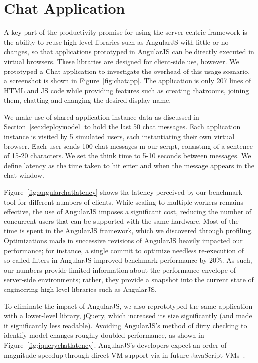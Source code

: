 \section{Chat Application} 

A key part of the productivity promise for using the server-centric \cb framework
is the ability to reuse high-level libraries such as AngularJS with little or
no changes, so that applications prototyped in AngularJS can be directly
executed in virtual browsers. These libraries are designed for client-side
use, however. We prototyped a Chat application to investigate the overhead
of this usage scenario, a screenshot is shown in Figure~\ref{fig:chatapp}.  
The application is only 207 lines of HTML and JS code while providing features such as 
creating chatrooms, joining them, chatting and changing the desired display name.

\chatroomfig{}

We make use of shared application instance data as discussed in Section~\ref{sec:deploymodel}
to hold the last 50 chat messages.  Each application instance is visited by 5 simulated users,
each instantiating their own virtual browser.  Each user sends 100 chat messages in our
script, consisting of a sentence of 15-20 characters.  We set the think time to 5-10 seconds
between messages.  We define latency as the time taken to hit enter and when the  message
appears in the chat window.

\angularchatlatency{}

Figure~\ref{fig:angularchatlatency} shows the latency perceived by our benchmark tool
for different numbers of clients.  While scaling to multiple workers remains effective,
the use of AngularJS imposes a significant cost, reducing the number of concurrent users 
that can be supported with the same hardware. Most of the time is spent in the AngularJS
framework, which we discovered through profiling. Optimizations made in successive revisions
of AngularJS heavily impacted our performance; for instance, a single commit to optimize
needless re-execution of so-called filters in AngularJS improved benchmark performance by 20\%.
As such, our numbers provide limited information about the performance envelope of
server-side environments; rather, they provide a snapshot into the current state of
engineering high-level libraries such as AngularJS.  

\jquerychatlatency{}
To eliminate the impact of AngularJS, we also reprototyped the same application with a
lower-level library, jQuery, which increased its size significantly (and made it significantly
less readable).  Avoiding AngularJS's method of dirty checking to identify model changes
roughly doubled performance, as shown in Figure~\ref{fig:jquerychatlatency}.
AngularJS's developers expect an order of magnitude speedup through direct VM 
support via  in future JavaScript VMs~\cite{angularjsspeedup}.

